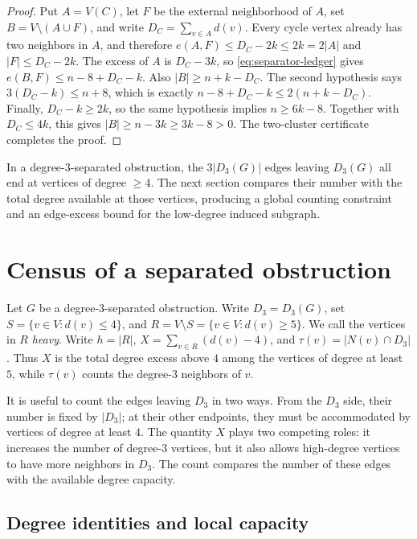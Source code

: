 \documentclass[11pt]{article}
\numberwithin{equation}{section}
\theoremstyle{definition}
\theoremstyle{remark}
\begin{document}
\begin{proof}
Put \(A=V(C)\), let \(F\) be the external neighborhood of \(A\), set
\(B=V\setminus(A\cup F)\), and write
\(D_C=\sum_{v\in A}d(v)\).  Every cycle vertex already has two
neighbors in \(A\), and therefore \(e(A,F)\le D_C-2k\le2k=2|A|\) and
\(|F|\le D_C-2k\).
The excess of \(A\) is \(D_C-3k\), so \eqref{eq:separator-ledger} gives
\(e(B,F)\le n-8+D_C-k\).  Also \(|B|\ge n+k-D_C\).  The second
hypothesis says \(3(D_C-k)\le n+8\), which is exactly
\(n-8+D_C-k\le2(n+k-D_C)\).
Finally, \(D_C-k\ge2k\), so the same hypothesis implies
\(n\ge6k-8\).  Together with \(D_C\le4k\), this gives
\(|B|\ge n-3k\ge3k-8>0\).  The two-cluster certificate completes the
proof.
\end{proof}

In a degree-\(3\)-separated obstruction, the \(3|D_3(G)|\) edges leaving
\(D_3(G)\) all end at vertices of degree \(\ge4\).  The next section compares
their number with the total degree available at those vertices, producing a
global counting constraint and an edge-excess bound for the low-degree
induced subgraph.

\section{Census of a separated obstruction}\label{sec:census}

Let \(G\) be a degree-\(3\)-separated obstruction.  Write
\(D_3=D_3(G)\), set \(S=\{v\in V:d(v)\le4\}\), and
\(R=V\setminus S=\{v\in V:d(v)\ge5\}\).  We call the vertices in
\(R\) \emph{heavy}.  Write \(h=|R|\),
\(X=\sum_{v\in R}(d(v)-4)\), and
\(\tau(v)=|N(v)\cap D_3|\).  Thus \(X\) is the total degree excess above
\(4\) among the vertices of degree at least \(5\), while \(\tau(v)\)
counts the degree-\(3\) neighbors of \(v\).

It is useful to count the edges leaving \(D_3\) in two ways.  From the
\(D_3\) side, their number is fixed by \(|D_3|\); at their other endpoints,
they must be accommodated by vertices of degree at least \(4\).  The quantity
\(X\) plays two competing roles: it increases the number of degree-\(3\)
vertices, but it also allows high-degree vertices to have more neighbors in
\(D_3\).  The count compares the number of these edges with the available
degree capacity.

\subsection{Degree identities and local capacity}
\end{document}
